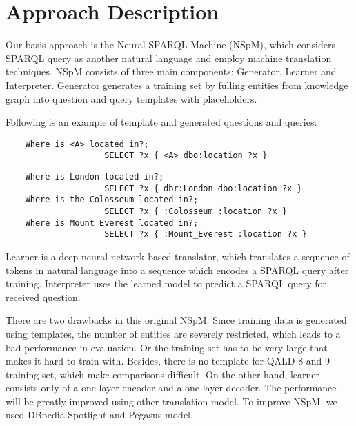 
\section{Approach Description}

Our basis approach is the Neural SPARQL Machine (NSpM)\cite{soru-marx-nampi2018},
which considers SPARQL query as another natural language and employ machine translation techniques. 
NSpM consists of three main components: 
Generator, Learner and Interpreter. 
Generator generates a training set
by fulling entities from knowledge graph into question and query templates with placeholders. 

Following is an example of template and generated questions and queries:

\begin{verbatim}
    Where is <A> located in?; 
                    SELECT ?x { <A> dbo:location ?x }
\end{verbatim}

\begin{verbatim}
    Where is London located in?; 
                    SELECT ?x { dbr:London dbo:location ?x }
    Where is the Colosseum located in?; 
                    SELECT ?x { :Colosseum :location ?x }
    Where is Mount Everest located in?; 
                    SELECT ?x { :Mount_Everest :location ?x }
\end{verbatim}

Learner is a deep neural network based translator, 
which translates a sequence of tokens in natural language
into a sequence which encodes a SPARQL query after training.
Interpreter uses the learned model to predict a SPARQL query for received question.

There are two drawbacks in this original NSpM.
Since training data is generated using templates, 
the number of entities are severely restricted,
which leads to a bad performance in evaluation.
Or the training set has to be very large
that makes it hard to train with. 
Besides, there is no template for QALD 8 and 9 training set,
which make comparisons difficult. 
On the other hand, 
learner consists only of a one-layer encoder and a one-layer decoder.
The performance will be greatly improved using other translation model.
To improve NSpM, we used DBpedia Spotlight and Pegasus model. 

